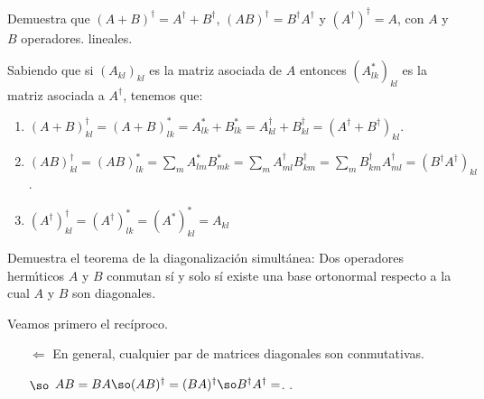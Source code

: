 \begin{problem}
	Demuestra que $(A + B)^\dagger = A^\dagger + B^\dagger$, $(AB)^\dagger = B^\dagger A^\dagger$ y $(A^\dagger)^\dagger = A$, con $A$ y $B$ operadores.
	lineales.
\end{problem}

\begin{solution}
	Sabiendo que si $(A_{kl})_{kl}$ es la matriz asociada de $A$ entonces $(A^*_{lk})_{kl}$ es la matriz asociada a $A^\dagger$, tenemos que:
	\begin{enumerate}
		\item $(A + B)^\dagger_{kl} = (A + B)^*_{lk} = A^*_{lk} + B^*_{lk} = A^\dagger_{kl} + B^\dagger_{kl} = (A^\dagger + B^\dagger)_{kl}$.
		\item $(AB)^\dagger_{kl} = (AB)^*_{lk} = \sum_{m}A^*_{lm}B^*_{mk} = \sum_{m}A^\dagger_{ml}B^\dagger_{km} = \sum_{m}B^\dagger_{km}A^\dagger_{ml} = (B^\dagger A^\dagger)_{kl}$.
		\item $(A^\dagger)^\dagger_{kl} = (A^\dagger)^*_{lk} = (A^*)^*_{kl} = A_{kl}$
	\end{enumerate}
\end{solution}

\begin{problem}
	Demuestra el teorema de la diagonalización simultánea: Dos operadores hermı́ticos $A$ y $B$ conmutan sí y solo sí existe una base ortonormal 	respecto a la cual $A$ y $B$ son diagonales.
\end{problem}

\begin{solution}
	Veamos primero el recíproco.
	\begin{enumerate}
		\item[$\Leftarrow$] En general, cualquier par de matrices diagonales son conmutativas.
		\item[$\so$] $AB=BA\so (AB)^\dagger = (BA)^\dagger\so B^\dagger A^\dagger = $. \pendiente{}.
	\end{enumerate}
\end{solution}

